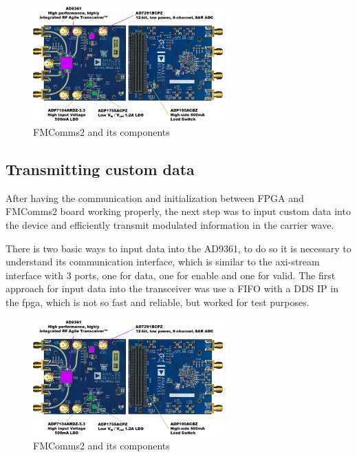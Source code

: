 \begin{figure}[htbp]
    \centering
    \includegraphics[width=0.65\textwidth]{./figures/fmcomms2_pic}
    \caption{ FMComms2 and its components
    \label{fig:fmcomm}}
\end{figure}

\subsection{Transmitting custom data}

After having the communication and initialization between FPGA and FMComms2 board
working properly, the next step was to input custom data into the device and
efficiently transmit modulated information in the carrier wave.

There is two basic ways to input data into the AD9361, to do so it is necessary to understand
its communication interface, which is similar to the axi-stream interface with
3 ports, one for data, one for enable and one for valid. The first approach for
input data into the transceiver was use a FIFO with a DDS IP in the fpga, which
is not so fast and reliable, but worked for test purposes.

\begin{figure}[htbp]
    \centering
    \includegraphics[width=0.65\textwidth]{./figures/fmcomms2_pic}
    \caption{ FMComms2 and its components
    \label{fig:fmcomm}}
\end{figure}

